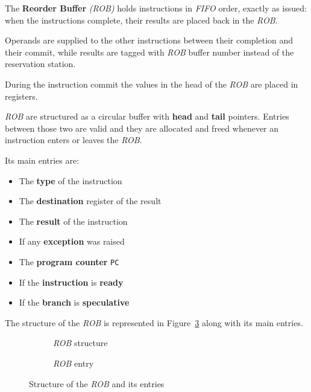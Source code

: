 \documentclass[english]{article}
\begin{document}
The \textbf{Reorder Buffer} \textit{(\textit{ROB})} holds instructions in \textit{FIFO} order, exactly as issued:
when the instructions complete, their results are placed back in the \textit{ROB}.

Operands are supplied to the other instructions between their completion and their commit, while results are tagged with \textit{ROB} buffer number instead of the reservation station.

During the instruction commit the values in the head of the \textit{ROB} are placed in registers.

\bigskip
\textit{ROB} are structured as a circular buffer with \textbf{head} and \textbf{tail} pointers.
Entries between those two are valid and they are allocated and freed whenever an instruction enters or leaves the \textit{ROB}.

Its main entries are:

\begin{itemize}
  \item The \textbf{type} of the instruction
  \item The \textbf{destination} register of the result
  \item The \textbf{result} of the instruction
  \item If any \textbf{exception} was raised
  \item The \textbf{program counter} \texttt{PC}
  \item If the \textbf{instruction} is \textbf{ready}
  \item If the \textbf{branch} is \textbf{speculative}
\end{itemize}

\bigskip
The structure of the \textit{ROB} is represented in Figure~\ref{fig:structure-of-ROB} along with its main entries.

\begin{figure}[htpb]
  \bigskip
  \centering
  \begin{subfigure}[]{\textwidth}
    \centering
    \caption{\textit{ROB} structure}
    \label{subfig:structure-rob}
  \end{subfigure}
  \par\bigskip
  \begin{subfigure}[]{\textwidth}
    \centering
    \caption{\textit{ROB} entry}
    \label{subfig:rob-entries}
  \end{subfigure}
  \caption{Structure of the \textit{ROB} and its entries}
  \label{fig:structure-of-ROB}
  \bigskip
\end{figure}
\end{document}
